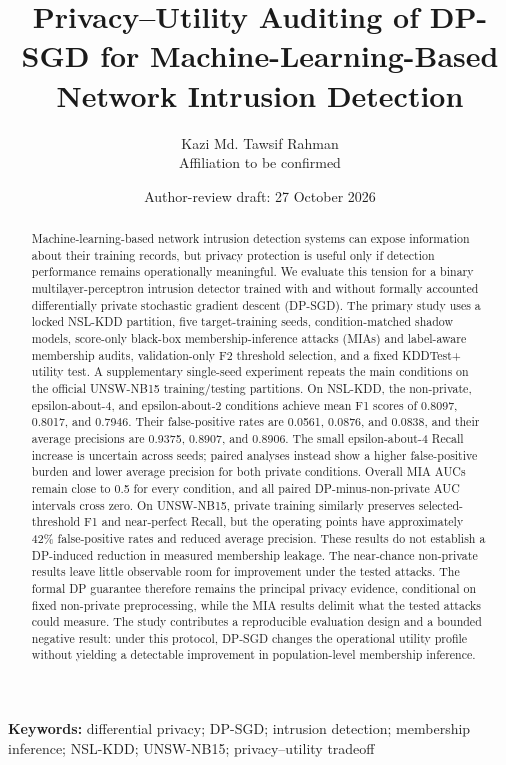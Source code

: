\documentclass[11pt,a4paper]{article}
\title{Privacy--Utility Auditing of DP-SGD for Machine-Learning-Based Network Intrusion Detection}
\author{Kazi Md. Tawsif Rahman\\\small Affiliation to be confirmed}
\date{Author-review draft: 27 October 2026}
\begin{document}
\maketitle

\begin{abstract}
Machine-learning-based network intrusion detection systems can expose
information about their training records, but privacy protection is
useful only if detection performance remains operationally meaningful.
We evaluate this tension for a binary multilayer-perceptron intrusion
detector trained with and without formally accounted differentially
private stochastic gradient descent (DP-SGD). The primary study uses a
locked NSL-KDD partition, five target-training seeds, condition-matched
shadow models, score-only black-box membership-inference attacks (MIAs)
and label-aware membership audits, validation-only F2 threshold
selection, and a fixed KDDTest+ utility test. A supplementary
single-seed experiment repeats the main conditions on the official
UNSW-NB15 training/testing partitions. On NSL-KDD, the non-private,
epsilon-about-4, and epsilon-about-2 conditions achieve mean F1 scores
of 0.8097, 0.8017, and 0.7946. Their false-positive rates are 0.0561,
0.0876, and 0.0838, and their average precisions are 0.9375, 0.8907, and
0.8906. The small epsilon-about-4 Recall increase is uncertain across
seeds; paired analyses instead show a higher false-positive burden and
lower average precision for both private conditions. Overall MIA AUCs
remain close to 0.5 for every condition, and all paired
DP-minus-non-private AUC intervals cross zero. On UNSW-NB15, private
training similarly preserves selected-threshold F1 and near-perfect
Recall, but the operating points have approximately 42\% false-positive
rates and reduced average precision. These results do not establish a
DP-induced reduction in measured membership leakage. The near-chance
non-private results leave little observable room for improvement under
the tested attacks. The formal DP guarantee therefore remains the
principal privacy evidence, conditional on fixed non-private
preprocessing, while the MIA results delimit what the tested attacks
could measure. The study contributes a reproducible evaluation design
and a bounded negative result: under this protocol, DP-SGD changes the
operational utility profile without yielding a detectable improvement in
population-level membership inference.

\end{abstract}

\textbf{Keywords:} differential privacy; DP-SGD; intrusion detection;
membership inference; NSL-KDD; UNSW-NB15; privacy--utility tradeoff
\end{document}
